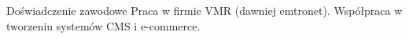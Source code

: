 \begin{rubric}{Doświadczenie zawodowe}
Praca w firmie VMR (dawniej emtronet).
Współpraca w tworzeniu systemów CMS i e-commerce.
\end{rubric}

